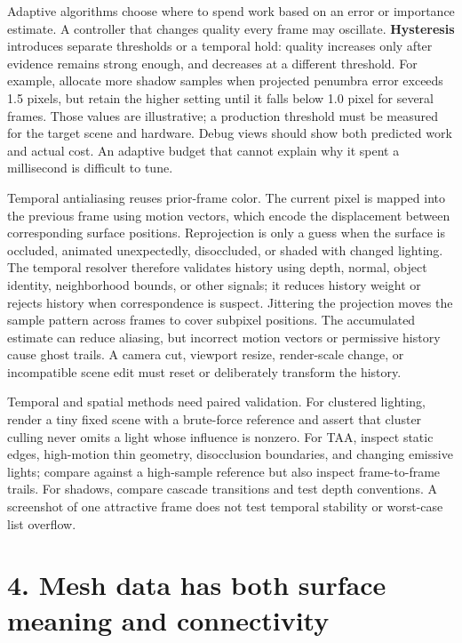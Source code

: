 Adaptive algorithms choose where to spend work based on an error or importance estimate. A controller that changes quality every frame may oscillate. \textbf{Hysteresis} introduces separate thresholds or a temporal hold: quality increases only after evidence remains strong enough, and decreases at a different threshold. For example, allocate more shadow samples when projected penumbra error exceeds 1.5 pixels, but retain the higher setting until it falls below 1.0 pixel for several frames. Those values are illustrative; a production threshold must be measured for the target scene and hardware. Debug views should show both predicted work and actual cost. An adaptive budget that cannot explain why it spent a millisecond is difficult to tune.

Temporal antialiasing reuses prior-frame color. The current pixel is mapped into the previous frame using motion vectors, which encode the displacement between corresponding surface positions. Reprojection is only a guess when the surface is occluded, animated unexpectedly, disoccluded, or shaded with changed lighting. The temporal resolver therefore validates history using depth, normal, object identity, neighborhood bounds, or other signals; it reduces history weight or rejects history when correspondence is suspect. Jittering the projection moves the sample pattern across frames to cover subpixel positions. The accumulated estimate can reduce aliasing, but incorrect motion vectors or permissive history cause ghost trails. A camera cut, viewport resize, render-scale change, or incompatible scene edit must reset or deliberately transform the history.

Temporal and spatial methods need paired validation. For clustered lighting, render a tiny fixed scene with a brute-force reference and assert that cluster culling never omits a light whose influence is nonzero. For TAA, inspect static edges, high-motion thin geometry, disocclusion boundaries, and changing emissive lights; compare against a high-sample reference but also inspect frame-to-frame trails. For shadows, compare cascade transitions and test depth conventions. A screenshot of one attractive frame does not test temporal stability or worst-case list overflow.

\section{4. Mesh data has both surface meaning and connectivity}\label{04-visual-computing-ii-ch037-mesh-data-has-both-surface-meaning-and-connectivity}


